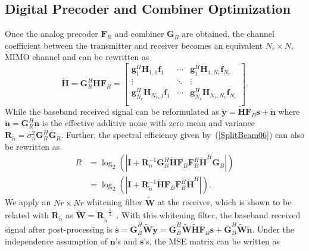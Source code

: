 \documentclass[11pt,draftcls,onecolumn]{IEEEtran}
\begin{document}
\subsection{Digital Precoder and Combiner Optimization}
Once the analog precoder $\bm{F}_{R}$ and combiner $\bm{G}_{R}$ are obtained, the channel coefficient between the transmitter and receiver becomes an equivalent $N_{r}\times N_{r}$ MIMO channel and can be rewritten as
\begin{equation}\label{SplitBeam18}
\widetilde{\bm{H}}=\bm{G}_{R}^{H}\bm{H}\bm{F}_{R}=\begin{bmatrix}
\bm{g}_{1}^{H}\bm{H}_{1,1}\bm{f}_{1}&\cdots
&\bm{g}_{1}^{H}\bm{H}_{1,N_{r}}\bm{f}_{N_{r}}\\
\vdots& \ddots&\vdots\\
\bm{g}_{N_{r}}^{H}\bm{H}_{N_{r},1}\bm{f}_{1}& \cdots&\bm{g}_{N_{r}}^{H}\bm{H}_{N_{r},N_{r}}\bm{f}_{N_{r}}\\
\end{bmatrix}.
\end{equation}
While the baseband received signal can be reformulated as $\widetilde{\bm{y}}=\widetilde{\bm{H}}\bm{F}_{B}\bm{s}+\widetilde{\bm{n}}$ where $\widetilde{\bm{n}}=\bm{G}_{R}^{H}\bm{n}$ is the effective additive noise with zero mean and variance $\bm{R}_{\widetilde{n}}=\sigma_{n}^{2}\bm{G}_{R}^{H}\bm{G}_{R}$. Further, the spectral efficiency given by~(\ref{SplitBeam06}) can also be rewritten as
\begin{subequations}\label{SplitBeam19}
\begin{align}
R&=\log_{2}\left(\left|\bm{I}+\bm{R}_{n}^{-1}\bm{G}_{B}^{H}\widetilde{\bm{H}}\bm{F}_{B}
\bm{F}_{B}^{H}\widetilde{\bm{H}}^{H}\bm{G}_{B}\right|\right)\label{SplitBeam19a}\\
&=\log_{2}\left(\left|\bm{I}+\bm{R}_{\widetilde{n}}^{-1}
\widetilde{\bm{H}}\bm{F}_{B}\bm{F}_{B}^{H}\widetilde{\bm{H}}^{H}\right|\right)\label{SplitBeam19b}.
\end{align}
\end{subequations}
We apply an $Nr\times Nr$ whitening filter $\widetilde{\bm{W}}$ at the receiver, which is
shown to be related with $\bm{R}_{\widetilde{n}}$ as $\widetilde{\bm{W}}=\bm{R}_{\widetilde{n}}^{-\frac{1}{2}}$~\cite{TWCShim2008,TITPalomar2006}. With this whitening filter, the baseband received signal after post-processing is $\overline{\bm{s}}=\overline{\bm{G}}_{B}^{H}\widetilde{\bm{W}}\widetilde{\bm{y}}=\overline{\bm{G}}_{B}^{H}
\widetilde{\bm{W}}\widetilde{\bm{H}}\bm{F}_{B}\bm{s}+\overline{\bm{G}}_{B}^{H}\widetilde{\bm{W}}\widetilde{\bm{n}}$. Under the independence assumption of $\bm{n}$'s and $\bm{s}$'s, the MSE matrix can be written as
\end{document}

